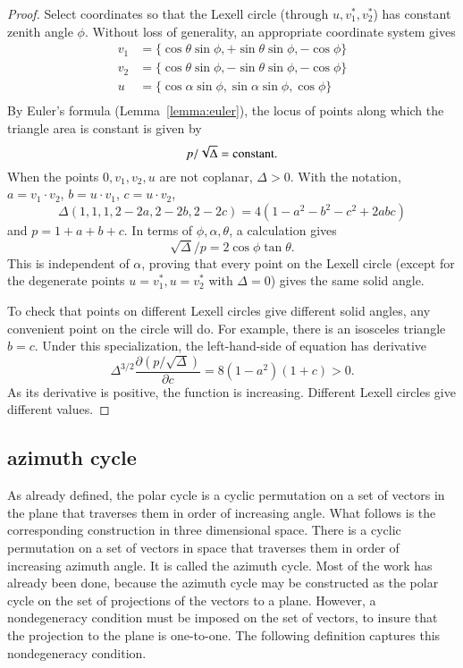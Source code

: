 \begin{proof}  Select coordinates so that the Lexell circle (through $u,v^*_1,v^*_2$) has constant zenith angle $\phi$.  Without loss of generality,  an appropriate coordinate system gives 
$$
\begin{array}{lll}
v_1 &= \{\cos\theta\sin\phi,+\sin\theta\sin\phi,-\cos\phi\}\\
v_2 &= \{\cos\theta\sin\phi,-\sin\theta\sin\phi,-\cos\phi\}\\
u &= \{\cos\alpha\sin\phi,\sin\alpha\sin\phi,\cos\phi\}\\
\end{array}
$$
By Euler's formula (Lemma~\ref{lemma:euler}), the locus of points along which the triangle area is constant is given by
\begin{equation}\label{eqn:Deltap}
p/\sqrt{\Delta} = \hbox{constant}.
\end{equation}
When the points $0,v_1,v_2,u$ are not coplanar, $\Delta>0$.
With the notation, $a = v_1\cdot v_2$, $b = u\cdot v_1$, $c= u\cdot v_2$,  
$$
\Delta(1,1,1,2-2a,2-2b,2-2c) = 4 (1-a^2-b^2-c^2+2 a b c)
$$ 
and
$p = 1+a+b+c$.    In terms of $\phi,\alpha,\theta$, a calculation gives
$$
\sqrt{\Delta}/p = 2\cos\phi \tan\theta.
$$
This is independent of $\alpha$, proving that every point on the Lexell circle (except for the degenerate points $u= v^*_1,u=v^*_2$ with $\Delta=0$) gives the same solid angle.

To check that points on different Lexell circles give different solid angles,  any convenient point on the circle will do.  For example, there is an isosceles triangle $b=c$.  Under this specialization, the left-hand-side of equation  has derivative
$$
\Delta^{3/2} \frac{\partial (p/\sqrt{\Delta})}{\partial c} = 8 (1-a^2)(1+c) > 0.
$$
As its derivative is positive, the function is increasing.  Different Lexell circles give different values.
\end{proof}


\subsection{azimuth cycle}

As already defined, the polar cycle is a cyclic permutation on a set
of vectors in the plane that traverses them in order of increasing
angle.  What follows is the corresponding construction in three dimensional
space.  There is  a cyclic permutation on a set of vectors in space
that traverses them in order of increasing azimuth angle.  It is called 
the azimuth cycle.  Most of the work has already been done, because the azimuth cycle may be constructed as the polar cycle on the set of projections of the vectors to a plane.  However, 
a nondegeneracy condition must be imposed on the set of vectors, to insure that
the projection to the plane is one-to-one.  The following
definition captures this nondegeneracy condition.


